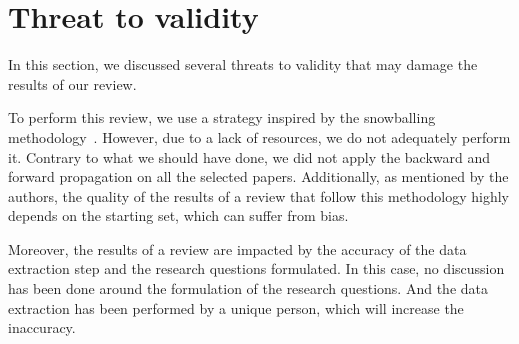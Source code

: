 \section{Threat to validity}
\label{sec:sota:validity}

In this section, we discussed several threats to validity that may damage the results of our review.

To perform this review, we use a strategy inspired by the snowballing methodology~\cite{DBLP:conf/ease/Wohlin14}.
However, due to a lack of resources, we do not adequately perform it.
Contrary to what we should have done, we did not apply the backward and forward propagation on all the selected papers.
Additionally, as mentioned by the authors, the quality of the results of a review that follow this methodology highly depends on the starting set, which can suffer from bias.

Moreover, the results of a review are impacted by the accuracy of the data extraction step and the research questions formulated.
In this case, no discussion has been done around the formulation of the research questions.
And the data extraction has been performed by a unique person, which will increase the inaccuracy.

